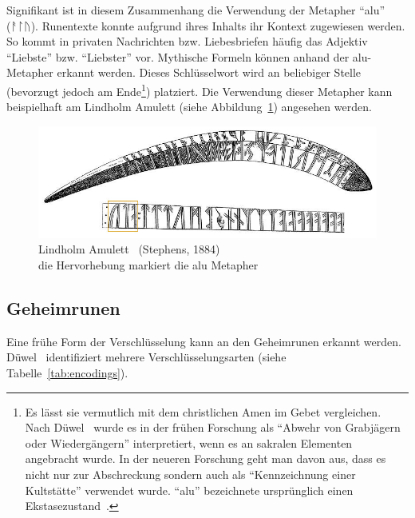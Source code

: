 \documentclass[a4paper]{scrartcl}
\begin{document}
Signifikant ist in diesem Zusammenhang die Verwendung der Metapher \enquote{alu} ({\runicfont ᚨᛚᚢ}). Runentexte konnte aufgrund ihres Inhalts ihr Kontext zugewiesen werden. So kommt in privaten Nachrichten bzw. Liebesbriefen häufig das Adjektiv \enquote{Liebste} bzw. \enquote{Liebster} vor. Mythische Formeln können anhand der alu-Metapher erkannt werden. Dieses Schlüsselwort wird an beliebiger Stelle (bevorzugt jedoch am Ende\footnote{Es lässt sie vermutlich mit dem christlichen Amen im Gebet vergleichen. Nach Düwel~\cite[S. 36]{düwel} wurde es in der frühen Forschung als \enquote{Abwehr von Grabjägern oder Wiedergängern} interpretiert, wenn es an sakralen Elementen angebracht wurde. In der neueren Forschung geht man davon aus, dass es nicht nur zur Abschreckung sondern auch als \enquote{Kennzeichnung einer Kultstätte} verwendet wurde. \enquote{alu} bezeichnete ursprünglich einen Ekstasezustand~\cite[S. 36]{düwel}.}) platziert. Die Verwendung dieser Metapher kann beispielhaft am Lindholm Amulett (siehe Abbildung~\ref{fig:lindholm}) angesehen werden.
%
\begin{figure}[p]
  \begin{center}
    \includegraphics[width=\textwidth]{images/lindholm_amulet.jpg}
    \caption{Lindholm Amulett~\cite{lindholm} (Stephens, 1884) \\ die Hervorhebung markiert die {\glqq alu\grqq} Metapher}
    \label{fig:lindholm}
  \end{center}
\end{figure}

\subsection{Geheimrunen}
%
Eine frühe Form der Verschlüsselung kann an den Geheimrunen erkannt werden. Düwel~\cite[S. 182]{düwel} identifiziert mehrere Verschlüsselungsarten (siehe Tabelle~\ref{tab:encodings}).
\end{document}
